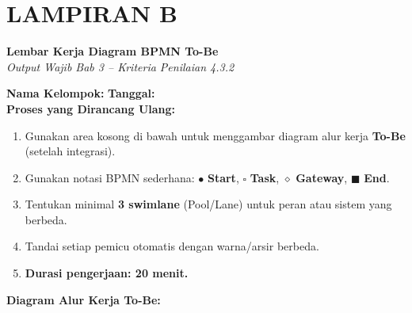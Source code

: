 \documentclass[12pt,a4paper]{report}
\newcommand{\fillline}[1][6cm]{\underline{\hspace{#1}}}
\begin{document}
\newpage
\section*{\color{plnblue} LAMPIRAN B}
{\Large\bfseries Lembar Kerja Diagram BPMN To-Be}\\[0.15cm]
{\normalsize\color{medgray}\textit{Output Wajib Bab 3 -- Kriteria Penilaian 4.3.2}}

\vspace{0.4cm}

\noindent\textbf{Nama Kelompok:} \fillline[5cm] \quad \textbf{Tanggal:} \fillline[3cm]\\[0.25cm]
\textbf{Proses yang Dirancang Ulang:} \fillline[9cm]

\begin{instruksibox}
\begin{enumerate}
    \item Gunakan area kosong di bawah untuk menggambar diagram alur kerja \textbf{To-Be} (setelah integrasi).
    \item Gunakan notasi BPMN sederhana: $\bullet$ \textbf{Start}, $\square$ \textbf{Task}, $\diamond$ \textbf{Gateway}, $\blacksquare$ \textbf{End}.
    \item Tentukan minimal \textbf{3 swimlane} (Pool/Lane) untuk peran atau sistem yang berbeda.
    \item Tandai setiap pemicu otomatis dengan warna/arsir berbeda.
    \item \textbf{Durasi pengerjaan: 20 menit.}
\end{enumerate}
\end{instruksibox}

\vspace{0.3cm}

\noindent\textbf{Diagram Alur Kerja To-Be:}
\vspace{0.3cm}
\end{document}
